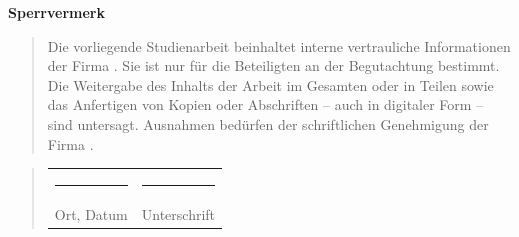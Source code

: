 \begin{titlepage}
	\begin{center}
		\vspace*{1cm}
		\Huge\bf Sperrvermerk\\
		\vspace*{2cm}
		\large\rm
		\begin{quotation}
			\hspace*{-1.75em}
			\parbox{0.85\textwidth}{\singlespacing Die vorliegende Studienarbeit beinhaltet interne vertrauliche Informationen der Firma \textbf{\myCompany}. Sie ist nur für die Beteiligten an der Begutachtung bestimmt. Die Weitergabe des Inhalts der Arbeit im Gesamten oder in Teilen sowie das Anfertigen von Kopien oder Abschriften – auch in digitaler Form – sind untersagt. Ausnahmen bedürfen der schriftlichen Genehmigung der Firma \textbf{\myCompany}.}
		\end{quotation}
		\vspace*{2cm}
		\begin{quotation}
			\hspace*{-1.75em}
			\parbox{\textwidth}{
				\singlespacing
				\begin{tabularx}{0.82\textwidth}{l@{\extracolsep\fill}l}
					\rule{5cm}{0.3mm} & \rule{5cm}{0.3mm} \\
					Ort, Datum & Unterschrift
				\end{tabularx}
			}
		\end{quotation}
	\end{center}
\end{titlepage}
\newpage
